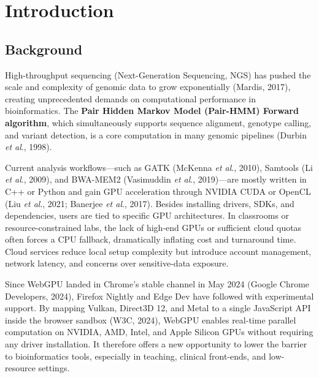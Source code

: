 \documentclass[PhD]{PHlab-thesis}
\begin{document}


\printnomenclature[5cm]

\newpage
\setcounter{page}{1}

\chapter{Introduction}
\section{Background}
High-throughput sequencing (Next-Generation Sequencing, NGS) has pushed the scale and complexity of genomic data to grow exponentially (Mardis, 2017), creating unprecedented demands on computational performance in bioinformatics. The \textbf{Pair Hidden Markov Model (Pair-HMM) Forward algorithm}, which simultaneously supports sequence alignment, genotype calling, and variant detection, is a core computation in many genomic pipelines (Durbin \emph{et al}., 1998).

Current analysis workflows—such as GATK (McKenna \emph{et al}., 2010), Samtools (Li \emph{et al}., 2009), and BWA-MEM2 (Vasimuddin \emph{et al}., 2019)—are mostly written in C++ or Python and gain GPU acceleration through NVIDIA CUDA or OpenCL (Liu \emph{et al}., 2021; Banerjee \emph{et al}., 2017). Besides installing drivers, SDKs, and dependencies, users are tied to specific GPU architectures. In classrooms or resource-constrained labs, the lack of high-end GPUs or sufficient cloud quotas often forces a CPU fallback, dramatically inflating cost and turnaround time. Cloud services reduce local setup complexity but introduce account management, network latency, and concerns over sensitive-data exposure.

Since WebGPU landed in Chrome's stable channel in May 2024 (Google Chrome Developers, 2024), Firefox Nightly and Edge Dev have followed with experimental support. By mapping Vulkan, Direct3D 12, and Metal to a single JavaScript API inside the browser sandbox (W3C, 2024), WebGPU enables real-time parallel computation on NVIDIA, AMD, Intel, and Apple Silicon GPUs without requiring any driver installation. It therefore offers a new opportunity to lower the barrier to bioinformatics tools, especially in teaching, clinical front-ends, and low-resource settings.
\end{document}

